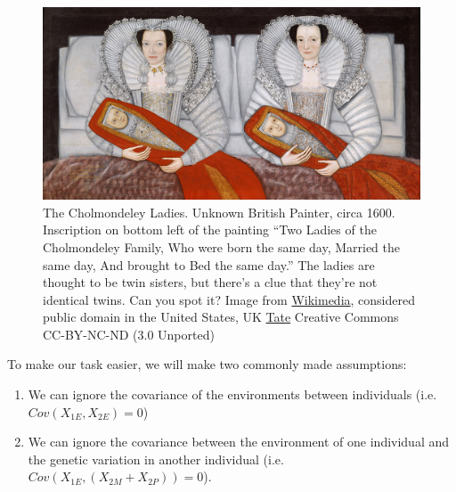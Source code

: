 \begin{figure}
 \begin{center}
 \includegraphics[width=0.85 \textwidth]{illustration_images/Quant_gen/Cholmondeley_Ladies/1024px-British_School_17th_century_-_The_Cholmondeley_Ladies_-_Google_Art_Project.jpg}
 \end{center}

  \caption{The Cholmondeley Ladies. Unknown British Painter, circa
    1600. Inscription on bottom left of the painting ``Two Ladies of
    the Cholmondeley Family, Who were born the same day, Married the
    same day, And brought to Bed the same day.'' The ladies are
    thought to be twin sisters, but there's a clue that they're not
    identical twins. Can you spot it?
    \newline \noindent  \tiny{  Image from
      \href{https://commons.wikimedia.org/wiki/File:British_School_17th_century_-_The_Cholmondeley_Ladies_-_Google_Art_Project.jpg}{Wikimedia},
      considered public domain in the United States, UK
      \href{https://www.tate.org.uk/art/artworks/unknown-artist-britain-the-cholmondeley-ladies-t00069}{Tate}
      \textcopyright Creative Commons
      CC-BY-NC-ND (3.0 Unported)}} \label{Fig:The_Cholmondeley_Ladies}
   \end{figure}

   \newpage
To make our task easier, we will make two commonly made assumptions:
\begin{enumerate}
\item We can ignore the covariance of the environments
between individuals (i.e. $Cov(X_{1E},X_{2E})=0$)
\item We can ignore the covariance
between the environment of one individual and the
genetic variation in another individual
(i.e. $Cov(X_{1E},(X_{2M}+X_{2P}))=0$). 
\end{enumerate}

